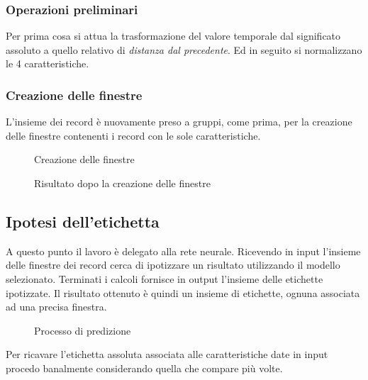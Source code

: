 \subsubsection{Operazioni preliminari}
Per prima cosa si attua la trasformazione del valore temporale dal significato assoluto a quello relativo di 
\textit{distanza dal precedente}.
Ed in seguito si normalizzano le 4 caratteristiche.


\subsubsection{Creazione delle finestre}
L'insieme dei record è nuovamente preso a gruppi, come prima, per la creazione delle finestre contenenti i 
record con le sole caratteristiche.

\vfill
\begin{figure}[H]
    \centering
    
    \caption{Creazione delle finestre}
    \label{fig:create_segments}
\end{figure}

\begin{figure}[H]
    \centering
    
    \caption{Risultato dopo la creazione delle finestre}
    \label{fig:segments}
\end{figure}



\subsection{Ipotesi dell'etichetta}
A questo punto il lavoro è delegato alla rete neurale.
Ricevendo in input l'insieme delle finestre dei record cerca di ipotizzare un risultato utilizzando 
il modello selezionato. Terminati i calcoli fornisce in output l'insieme delle etichette ipotizzate.
Il risultato ottenuto è quindi un insieme di etichette, ognuna associata ad una precisa finestra. 

\begin{figure}[H]
    \centering
    
    \caption{Processo di predizione}
    \label{fig:prediction}
\end{figure}

\noindent Per ricavare l'etichetta assoluta associata alle caratteristiche date in input procedo banalmente 
considerando quella che compare più volte.